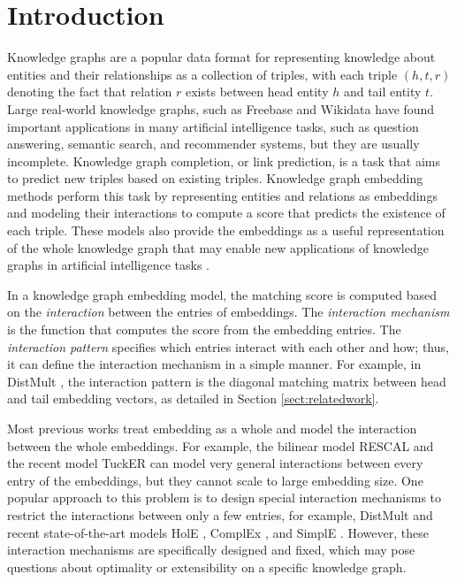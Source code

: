 \documentclass{ecai}
\theoremstyle{plain}  \newtheorem{thm}{Theorem}  \newtheorem{lem}[thm]{Lemma}  \newtheorem{prop}[thm]{Proposition}
\theoremstyle{remark}  \newtheorem*{rem}{Remark}
\begin{document}
\section{Introduction} \label{sect:intro} Knowledge graphs are a popular data format for representing knowledge about entities and their relationships as a collection of triples, with each triple $ (h, t, r) $ denoting the fact that relation $ r $ exists between head entity $ h $ and tail entity $ t $. Large real-world knowledge graphs, such as Freebase \cite{bollacker_freebasecollaborativelycreated_2008} and Wikidata \cite{vrandecic_wikidatafreecollaborative_2014} have found important applications in many artificial intelligence tasks, such as question answering, semantic search, and recommender systems, but they are usually incomplete. Knowledge graph completion, or link prediction, is a task that aims to predict new triples based on existing triples. Knowledge graph embedding methods perform this task by representing entities and relations as embeddings and modeling their interactions to compute a score that predicts the existence of each triple. These models also provide the embeddings as a useful representation of the whole knowledge graph that may enable new applications of knowledge graphs in artificial intelligence tasks \cite{tran_exploringscholarlydata_2019}.

In a knowledge graph embedding model, the matching score is computed based on the \textit{interaction} between the entries of embeddings. The \textit{interaction mechanism} is the function that computes the score from the embedding entries. The \textit{interaction pattern} specifies which entries interact with each other and how; thus, it can define the interaction mechanism in a simple manner. For example, in DistMult \cite{yang_embeddingentitiesrelations_2015}, the interaction pattern is the diagonal matching matrix between head and tail embedding vectors, as detailed in Section \ref{sect:relatedwork}.

Most previous works treat embedding as a whole and model the interaction between the whole embeddings. For example, the bilinear model RESCAL \cite{nickel_threewaymodelcollective_2011} and the recent model TuckER \cite{balazevic_tuckertensorfactorization_2019} can model very general interactions between every entry of the embeddings, but they cannot scale to large embedding size. One popular approach to this problem is to design special interaction mechanisms to restrict the interactions between only a few entries, for example, DistMult \cite{yang_embeddingentitiesrelations_2015} and recent state-of-the-art models HolE \cite{nickel_holographicembeddingsknowledge_2016}, ComplEx \cite{trouillon_complexembeddingssimple_2016}, and SimplE \cite{kazemi_simpleembeddinglink_2018,lacroix_canonicaltensordecomposition_2018}. However, these interaction mechanisms are specifically designed and fixed, which may pose questions about optimality or extensibility on a specific knowledge graph. 
\end{document}
